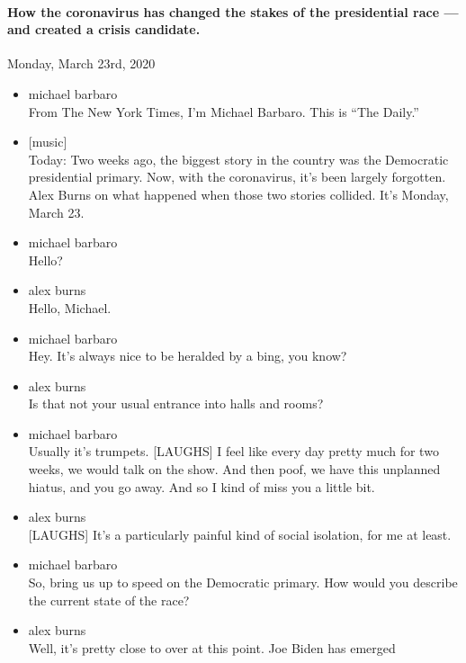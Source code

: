 \hypertarget{how-the-coronavirus-has-changed-the-stakes-of-the-presidential-race--and-created-a-crisis-candidate}{%
\paragraph{How the coronavirus has changed the stakes of the
presidential race --- and created a crisis
candidate.}\label{how-the-coronavirus-has-changed-the-stakes-of-the-presidential-race--and-created-a-crisis-candidate}}

Monday, March 23rd, 2020

\begin{itemize}
\item
  michael barbaro\\
  From The New York Times, I'm Michael Barbaro. This is ``The Daily.''
\item
  {[}music{]}\\
  Today: Two weeks ago, the biggest story in the country was the
  Democratic presidential primary. Now, with the coronavirus, it's been
  largely forgotten. Alex Burns on what happened when those two stories
  collided. It's Monday, March 23.
\item
  michael barbaro\\
  Hello?
\item
  alex burns\\
  Hello, Michael.
\item
  michael barbaro\\
  Hey. It's always nice to be heralded by a bing, you know?
\item
  alex burns\\
  Is that not your usual entrance into halls and rooms?
\item
  michael barbaro\\
  Usually it's trumpets. {[}LAUGHS{]} I feel like every day pretty much
  for two weeks, we would talk on the show. And then poof, we have this
  unplanned hiatus, and you go away. And so I kind of miss you a little
  bit.
\item
  alex burns\\
  {[}LAUGHS{]} It's a particularly painful kind of social isolation, for
  me at least.
\item
  michael barbaro\\
  So, bring us up to speed on the Democratic primary. How would you
  describe the current state of the race?
\item
  alex burns\\
  Well, it's pretty close to over at this point. Joe Biden has emerged

\end{itemize}
